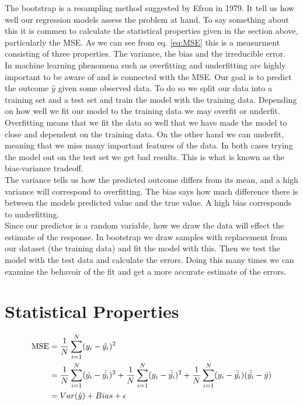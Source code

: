 \documentclass[a4paper,12pt, english]{article}
\begin{document}
The bootstrap is a resampling method suggested by Efron in 1979. It tell us how well our regression models assess the problem at hand. To say something about this it is commen to calculate the statistical properties given in the section above, particularly the MSE. As we can see from eq. \ref{eq:MSE} this is a measurment consisting of three properties. The variance, the bias and the irreducible error.	\\
In machine learning phenomena such as overfitting and underfitting are highly important to be aware of and is connected with the MSE. Our goal is to predict the outcome $\hat{y}$ given some observed data. To do so we split our data into a training set and a test set and train the model with the training data. Depending on how well we fit our model to the training data we may overfit or underfit. Overfitting means that we fit the data so well that we have made the model to close and dependent on the training data. 
On the other hand we can underfit, meaning that we miss many important features of the data. In both cases trying the model out on the test set we get bad results. This is what is known as the bias-variance tradeoff. \\
The variance tells us how the predicted outcome differs from its mean, and a high variance will correspond to overfitting. The bias says how much difference there is between the models predicted value and the true value. A high bias corresponds to underfitting. \\
Since our predictor is a random variable, how we draw the data will effect the estimate of the response. In bootstrap we draw samples with replacement from our dataset (the training data) and fit the model with this. Then we test the model with the test data and calculate the errors. Doing this many times we can examine the behavoir of the fit and get a more accurate estimate of the errors.

\section{Statistical Properties}

\begin{align} \label{eq:MSE}
\textnormal{MSE} &= \frac{1}{N} \sum_{i=1}^N (y_i - \hat{y_i})^2 \\
&= \frac{1}{N} \sum_{i=1}^N (\hat{y_i} - \bar{\hat{y_i}})^2 + \frac{1}{N} \sum_{i=1}^N (y_i - \bar{\hat{y_i}})^2 + \frac{1}{N} \sum_{i=1}^N (y_i - \bar{\hat{y_i}})(\bar{\hat{y_i}} - \hat{y}) \\
&= Var(\hat{y}) + Bias + \epsilon
\end{align}
\end{document}
